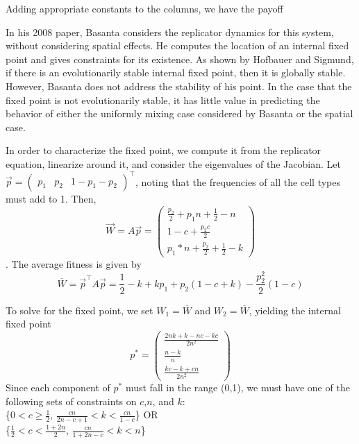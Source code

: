 \documentclass[12pt]{amsart}
\newcommand{\tab}{\hspace*{2em}}
\begin{document}





Adding appropriate constants to the columns, we have the payoff 

In his 2008 paper, Basanta considers the replicator dynamics for this system, without considering spatial effects. He computes the location of an internal fixed point and gives constraints for its existence. As shown by Hofbauer and Sigmund, if there is an evolutionarily stable internal fixed point, then it is globally stable. However, Basanta does not address the stability of his point. In the case that the fixed point is not evolutionarily stable, it \cite{Hofbauer1998} has little value in predicting the behavior of either the uniformly mixing case considered by Basanta or the spatial case. 

In order to characterize the fixed point, we compute it from the replicator equation, linearize around it, and consider the eigenvalues of the Jacobian.
Let $\vec{p} = { \begin{pmatrix} p_1 & p_2 & 1-p_1-p_2 \end{pmatrix}}^\top$, noting that the frequencies of all the cell types must add to 1. Then, $$\vec{W} = A\vec{p} = 
{\begin{pmatrix} \frac{p_2}{2} + p_1 n + \frac{1}{2}-n\\
1-c + \frac{p_2 c}{2}\\ %
p_1*n+\frac{p_2}{2} + \frac{1}{2}-k \end{pmatrix}}$$. The average fitness is given by  $$\overline{W} = \vec{p}^\top A \vec{p} = \frac{1}{2}-k+ k p_1 + p_2 (1 - c + k) - \frac{p_2^2}{2} (1-c) $$

To solve for the fixed point, we set $W_1 = \overline{W}$ and $W_2 = \overline{W}$, yielding the internal fixed point 
$$p^* = {\begin{pmatrix}\displaystyle{\frac{2 n k + k - n c - k c}{2n^2}}\\
		\displaystyle{\frac{n-k}{n}}\\
		\displaystyle{\frac{k c - k + c n}{2n^2}}
		\end{pmatrix}}$$
Since each component of $p^*$ must fall in the range (0,1), we must have one of the following sets of constraints on $c$,$n$, and $k$: \\
\{$\displaystyle{0 < c \ge \frac{1}{2}}$, $\displaystyle{\frac{c n}{2 n - c + 1} < k < \frac{c n}{1-c}}$\} \tab OR \\
\{$\displaystyle{\frac{1}{2} < c < \frac{1 + 2n}{2}}$, 
$\displaystyle{\frac{c n}{1 + 2n - c} < k < n}$\}
\end{document}
